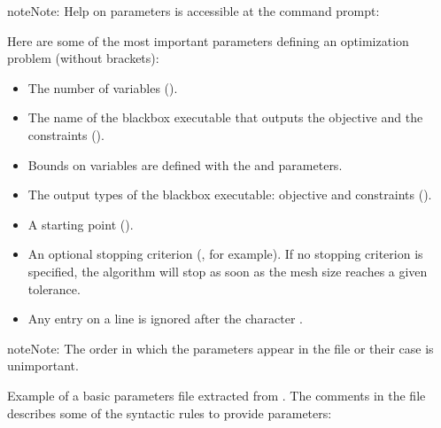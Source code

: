 \documentclass[letterpaper,10pt,english]{sphinxmanual}
\begin{document}
\begin{sphinxadmonition}{note}{Note:}
\sphinxAtStartPar
Help on parameters is accessible at the command prompt:
\end{sphinxadmonition}

\sphinxAtStartPar
Here are some of the most important parameters defining an optimization problem (without brackets):
\begin{itemize}
\item {} 
\sphinxAtStartPar
The number of variables ().

\item {} 
\sphinxAtStartPar
The name of the blackbox executable that outputs the objective and the constraints ().

\item {} 
\sphinxAtStartPar
Bounds on variables are defined with the  and  parameters.

\item {} 
\sphinxAtStartPar
The output types of the blackbox executable: objective and constraints ().

\item {} 
\sphinxAtStartPar
A starting point ().

\item {} 
\sphinxAtStartPar
An optional stopping criterion (, for example).
If no stopping criterion is specified, the algorithm will stop as soon as the mesh size reaches a given tolerance.

\item {} 
\sphinxAtStartPar
Any entry on a line is ignored after the character \sphinxcode{\sphinxupquote{\#}}.

\end{itemize}

\begin{sphinxadmonition}{note}{Note:}
\sphinxAtStartPar
The order in which the parameters appear in the file or their case is unimportant.
\end{sphinxadmonition}

\sphinxAtStartPar
Example of a basic parameters file extracted from .
The comments in the file describes some of the syntactic rules to provide parameters:
\end{document}
